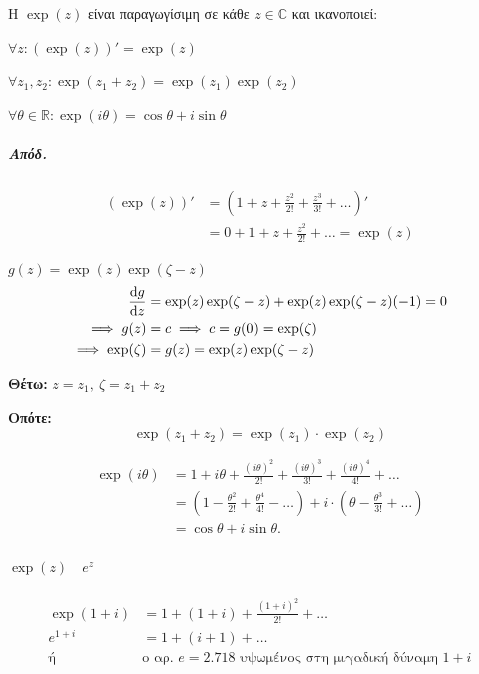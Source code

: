 \documentclass[12pt,a4paper,notitlepage,fleqn]{article}
\begin{document}
    \begin{theorem*}{}
    	Η \( \exp(z) \) είναι παραγωγίσιμη σε κάθε \( z\in\mathbb C  \)
    	και ικανοποιεί:
    	\begin{enumparen}
    		\item \( \forall z: \left(\exp(z)\right)' = \exp(z) \)
    		\item \( \forall z_1,z_2:\exp(z_1+z_2)=\exp(z_1)\exp(z_2) \)
    		\item \( \forall \theta\in\mathbb R
    		:\exp(i\theta)=\cos\theta+i\sin\theta \)
    	\end{enumparen}
    \end{theorem*}
    \subparagraph{Απόδ.}
    \begin{enumparen}{}
    	\item \begin{align*}
    	\left(\exp(z)\right)'
    	&= \left(1+z+\frac{z^2}{2!}+\frac{z^3}{3!}+\dots\right)'
    	\\ &= 0+1+z+\frac{z^2}{2!}+\dots = \exp(z)
    	\end{align*}
    	\item \( g(z)=\exp(z)\exp(\zeta-z) \)
    	\begin{align*}
    	\od{g}{z} &=
    	\exp(z)\exp(\zeta-z)+\exp(z)\exp(\zeta-z)(-1) = 0
    	\\ \implies g(z) &= c \implies c=g(0)=\exp(\zeta) \\
    	\implies \exp(\zeta)&=g(z)=\exp(z)\exp(\zeta-z)
    	\end{align*}

    	\textbf{Θέτω:} \( z=z_1,\ \zeta=z_1+z_2 \)

    	\textbf{Οπότε:}
    	\[
    	\exp(z_1+z_2) = \exp(z_1)\cdot\exp(z_2)
    	\]

    	\item \begin{align*}
    	\exp(i\theta) &= 1+i\theta + \frac{(i\theta)^2}{2!} + \frac{(i\theta)^3}{3!}
    	+\frac{(i\theta)^4}{4!} + \dots
    	\\ &= \left(1-\frac{\theta^2}{2!}+\frac{\theta^4}{4!}-\dots \right)
    	+ i\cdot\left(
    	\theta-\frac{\theta^3}{3!}+\dots
    	\right)
    	\\ &= \cos\theta+i\sin\theta.
    	\end{align*}

    	\paragraph{\( \exp(z) \quad e^z \)}
    	\begin{align*}
    	\exp(1+i)&=1+(1+i)+\frac{(1+i)^2}{2!}+\dots\\[.4pt]
    	e^{1+i} &= 1+(i+1)+\dots\\
    	\text{ή}\quad &\text{ο αρ. $e=2.718$ υψωμένος στη μιγαδική δύναμη } 1+i
    	\end{align*}


\end{enumparen}
\end{document}
